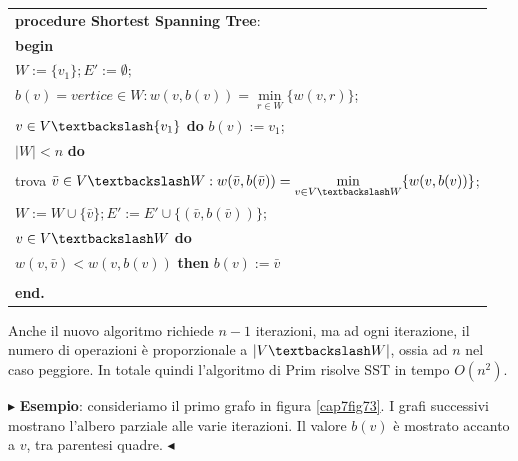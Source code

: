 \documentclass[11pt]{book}
\begin{document}
\vspace{11pt}
\begin{center}
  \begin{tabular}{||l||}
    \hline\hline
    {\bf procedure Shortest Spanning Tree}:\\
    {\bf begin}\\
    \phantom{aa}$W:=\{v_1\}; E':=\emptyset;$\\
    \phantom{aa}{\bf comment:} $b(v) = vertice \in W : w(v,b(v)) =
    \min\limits_{r \in W} \{ w(v,r) \}$;\\
    \phantom{aa}{\bf for each} $v \in V \textbackslash \{ v_1 \}$ {\bf do} $b(v)
    := v_1$;\\
    \phantom{aa}{\bf while} $|W| < n$ {\bf do}\\
    \phantom{aaaa}{\bf begin}\\
    \phantom{aaaaaa}trova $\bar{v} \in V \textbackslash W : w(\bar{v},b(\bar{v}))
    = \min\limits_{v \in V \textbackslash W} \{ w(v,b(v)) \}$;\\
    \phantom{aaaaaa}$W := W \cup \{ \bar{v} \}; E':= E' \cup \{
    (\bar{v},b(\bar{v}))\};$\\
    \phantom{aaaaaa}{\bf for each} $v \in V \textbackslash W$ {\bf do}\\
    \phantom{aaaaaaaa}{\bf if} $w(v,\bar{v}) < w(v,b(v))$ {\bf then}
    $b(v) := \bar{v}$\\
    \phantom{aaaa}{\bf end}\\
    {\bf end.}\\
    \hline\hline
  \end{tabular}
\end{center}
\vspace{11pt}

Anche il nuovo algoritmo richiede $n-1$ iterazioni, ma ad ogni
iterazione, il numero di operazioni \`e proporzionale a $|V
\textbackslash W|$, ossia ad $n$ nel caso peggiore. In totale quindi
l'algoritmo di Prim risolve SST in tempo $O(n^2)$. 

\vspace{11pt} $\blacktriangleright$ {\bf Esempio}: consideriamo il
primo grafo in figura \ref{cap7fig73}. I grafi successivi mostrano
l'albero parziale alle varie iterazioni. Il valore $b(v)$ \`e mostrato
accanto a $v$, tra parentesi quadre. $\blacktriangleleft$
\vspace{11pt}
\end{document}
